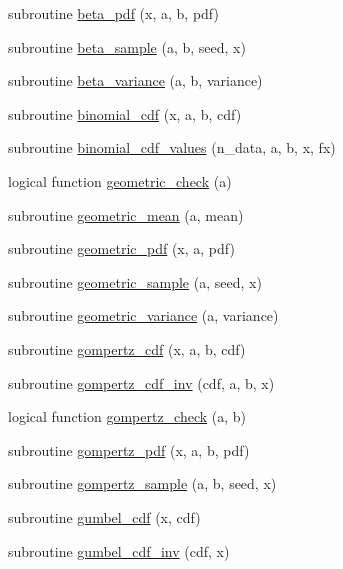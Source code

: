 \begin{DoxyCompactItemize}
subroutine \hyperlink{subroutines_8f_a98e50467dd638445b02798a39288af88}{beta\+\_\+pdf} (x, a, b, pdf)
\item 
subroutine \hyperlink{subroutines_8f_a4c2f42901cceca59466dde111153a465}{beta\+\_\+sample} (a, b, seed, x)
\item 
subroutine \hyperlink{subroutines_8f_a646b52af6a87a1f9ad45365d12e84074}{beta\+\_\+variance} (a, b, variance)
\item 
subroutine \hyperlink{subroutines_8f_af7299d3fda796eea9a1be0c256f1624b}{binomial\+\_\+cdf} (x, a, b, cdf)
\item 
subroutine \hyperlink{subroutines_8f_a8f4f3c2c05b8593455672a09762700d8}{binomial\+\_\+cdf\+\_\+values} (n\+\_\+data, a, b, x, fx)
\item 
logical function \hyperlink{subroutines_8f_a5a9de1b5360cf06f54e5c25a475a9f34}{geometric\+\_\+check} (a)
\item 
subroutine \hyperlink{subroutines_8f_a1ffa752cfa7e58c775d58ebf3ddff183}{geometric\+\_\+mean} (a, mean)
\item 
subroutine \hyperlink{subroutines_8f_ad7c75816231cf277056551ca6c56d50d}{geometric\+\_\+pdf} (x, a, pdf)
\item 
subroutine \hyperlink{subroutines_8f_a8e9806974aa07e008b7027a4d4fccca8}{geometric\+\_\+sample} (a, seed, x)
\item 
subroutine \hyperlink{subroutines_8f_ae112b39e2f8d5468f1f366cc8e3afd90}{geometric\+\_\+variance} (a, variance)
\item 
subroutine \hyperlink{subroutines_8f_af902e014759d310f9104881f90934632}{gompertz\+\_\+cdf} (x, a, b, cdf)
\item 
subroutine \hyperlink{subroutines_8f_aca5ab8f72105aabb509bd487e8c8b6e6}{gompertz\+\_\+cdf\+\_\+inv} (cdf, a, b, x)
\item 
logical function \hyperlink{subroutines_8f_a6dcecb2ef74b499aa1313117cb5bf666}{gompertz\+\_\+check} (a, b)
\item 
subroutine \hyperlink{subroutines_8f_ad1b796cd8b7d10dc0096cf2a42b748be}{gompertz\+\_\+pdf} (x, a, b, pdf)
\item 
subroutine \hyperlink{subroutines_8f_adee76c73484194b0ddb1c677c0d03407}{gompertz\+\_\+sample} (a, b, seed, x)
\item 
subroutine \hyperlink{subroutines_8f_a3406fe8568d2dfb52a66cc4470893365}{gumbel\+\_\+cdf} (x, cdf)
\item 
subroutine \hyperlink{subroutines_8f_af645551cd94f4f929966f33fade3bb03}{gumbel\+\_\+cdf\+\_\+inv} (cdf, x)
\item 

\end{DoxyCompactItemize}
